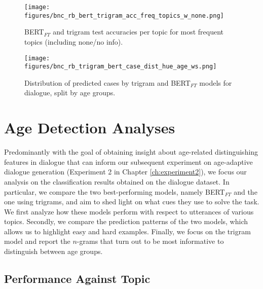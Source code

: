 \begin{figure}
    \centering
    \begin{minipage}{0.45\textwidth}
        \centering
        \texttt{[image: figures/bnc\_rb\_bert\_trigram\_acc\_freq\_topics\_w\_none.png]} %
        \caption{BERT$_{FT}$ and trigram test accuracies per topic for most frequent topics (including none/no info).}\label{fig:bnc_tri_bert_acc_topics_w_none}
    \end{minipage}\hfill
    \begin{minipage}{0.45\textwidth}
        \centering
        \texttt{[image: figures/bnc\_rb\_trigram\_bert\_case\_dist\_hue\_age\_ws.png]} %
        \caption{Distribution of predicted cases by trigram and BERT$_{FT}$ models for dialogue, split by age groups.}\label{fig:bnc_blog_age_topic_dist_incl_unk}
    \end{minipage}
\end{figure}

\section{Age Detection Analyses}
\label{sec:exp1_analyses}
Predominantly with the goal of obtaining insight about age-related distinguishing features in dialogue that can inform our subsequent experiment on age-adaptive dialogue generation (Experiment 2 in Chapter \ref{ch:experiment2}), we focus our analysis on the classification results obtained on the dialogue dataset. In particular, we compare the two best-performing models, namely BERT$_{FT}$
and the one using trigrams, and aim to shed light on  what cues they use to solve the task.
We first analyze how these models perform with respect to utterances of various topics.
Secondly, we compare the prediction patterns of the two models, which allows us to highlight easy and hard examples.
Finally, we focus on the trigram model and report the $n$-grams that turn out to be most informative to distinguish between age groups.


\subsection{Performance Against Topic}


